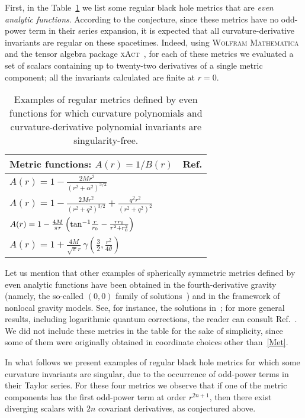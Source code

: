 \documentclass[aps,prd,a4paper,twocolumn,showpacs,showkeys,preprintnumbers,amsmath,amssymb,nofootinbib,usenames,dvipsnames]{revtex4-2}
\def\ga{\gamma}
\def\th{\theta}
\begin{document}
First, in the Table~\ref{table1} we list some regular black hole metrics that are \emph{even analytic functions}. 
According to the conjecture, since these metrics have no odd-power term in their series expansion, it is expected that all curvature-derivative invariants are regular on these spacetimes. Indeed, using \textsc{Wolfram Mathematica}~\cite{Mathematica} and the tensor algebra package \textsc{xAct}~\cite{xAct,xCoba}, for each of these metrics we evaluated a set of scalars containing up to twenty-two derivatives of a single metric component; all the invariants calculated are finite at $r=0$.  
\begin{table}[h]
\begin{tabular}{|l|c|}
\hline
Metric functions: $A(r) = 1/B(r)$ & Ref. 
\\ 
\hline
$A(r) =  1 -\frac{2Mr^2}{(r^2+\alpha^2)^{3/2}}$ & \cite{Bardeen}
\\
$A(r) =  1 -\frac{2Mr^2}{(r^2+q^2)^{3/2}} + \frac{q^2 r^2}{(r^2 + q^2)^2}$ & \cite{AyonBeato:1998ub} 
\\
$A(r) =  1-{4M\over \pi r}\left(\mbox{tan}^{-1}{r\over r_0}-
{rr_0\over r^2+r_0^2}\right)$ & \cite{Dymnikova:2004zc} 
\\
$A(r) = 1 + \frac{4M}{\sqrt{\pi} r} \, \ga ( \frac32, \frac{r^2}{4\th} )  $ & \cite{Nicolini:2005vd} 
\\
\hline
\end{tabular}
\caption{Examples of regular metrics defined by even functions for which curvature polynomials and curvature-derivative polynomial invariants are singularity-free.}
\label{table1}
\end{table}

Let us mention that other examples of spherically symmetric metrics defined by even analytic functions have been obtained in the fourth-derivative gravity (namely, the so-called $(0,0)$ family of solutions~\cite{Stelle78,Stelle15-PRL-PRD,Holdom:2016nek}) and
in the framework of nonlocal gravity models.
See, for instance, the solutions in~\cite{Tseytlin:1995uq,Zhang14,Frolov:Exp,Frolov:Poly,Head-On,Buoninfante:2018rlq,Boos:2021kqe,Nicolini:2019irw,Nicolini:2012eu}; for more general results, including logarithmic quantum corrections, the reader can consult Ref.~\cite{Nos6der}. 
We did not include these metrics in the table for the sake of simplicity, since some of them were originally obtained in coordinate choices other than~\eqref{Met}.

In what follows we present examples of regular black hole metrics for which some curvature invariants are singular, due to the occurrence of odd-power terms in their Taylor series. For these four metrics we observe that if one of the metric components has the first odd-power term at order $r^{2n+1}$, then there exist diverging scalars with $2n$ covariant derivatives, as conjectured above.
\end{document}
